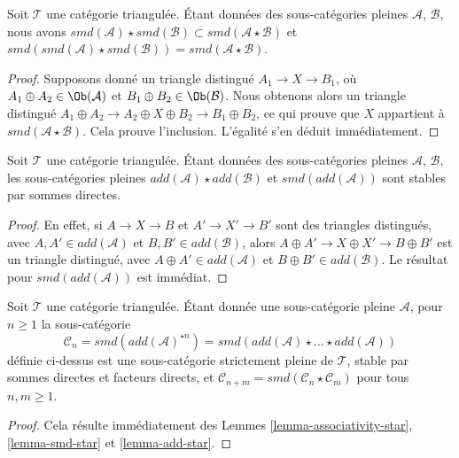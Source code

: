 \begin{lemma}
\label{lemma-smd-star}
Soit $\mathcal{T}$ une catégorie triangulée.
Étant données des sous-catégories pleines $\mathcal{A}$, $\mathcal{B}$, nous
avons
$smd(\mathcal{A}) \star smd(\mathcal{B}) \subset
smd(\mathcal{A} \star \mathcal{B})$ et
$smd(smd(\mathcal{A}) \star smd(\mathcal{B})) =
smd(\mathcal{A} \star \mathcal{B})$.
\end{lemma}

\begin{proof}
Supposons donné un triangle distingué $A_1 \to X \to B_1$, où
$A_1 \oplus A_2 \in \Ob(\mathcal{A})$ et
$B_1 \oplus B_2 \in \Ob(\mathcal{B})$.
Nous obtenons alors un triangle distingué
$A_1 \oplus A_2 \to A_2 \oplus X \oplus B_2 \to B_1 \oplus B_2$, ce qui
prouve que $X$ appartient à $smd(\mathcal{A} \star \mathcal{B})$.
Cela prouve l'inclusion. L'égalité s'en déduit immédiatement.
\end{proof}

\begin{lemma}
\label{lemma-add-star}
Soit $\mathcal{T}$ une catégorie triangulée. Étant données des sous-catégories
pleines $\mathcal{A}$, $\mathcal{B}$, les sous-catégories pleines
$add(\mathcal{A}) \star add(\mathcal{B})$ et $smd(add(\mathcal{A}))$ sont
stables par sommes directes.
\end{lemma}

\begin{proof}
En effet, si $A \to X \to B$ et $A' \to X' \to B'$ sont des triangles
distingués, avec $A, A' \in add(\mathcal{A})$ et
$B, B' \in add(\mathcal{B})$, alors
$A \oplus A' \to X \oplus X' \to B \oplus B'$ est un triangle distingué,
avec $A \oplus A' \in add(\mathcal{A})$ et
$B \oplus B' \in add(\mathcal{B})$.
Le résultat pour $smd(add(\mathcal{A}))$ est immédiat.
\end{proof}

\begin{lemma}
\label{lemma-cone-n}
Soit $\mathcal{T}$ une catégorie triangulée. Étant donnée une sous-catégorie
pleine $\mathcal{A}$, pour $n \geq 1$ la sous-catégorie
$$
\mathcal{C}_n = smd(add(\mathcal{A})^{\star n}) =
smd(add(\mathcal{A}) \star \ldots \star add(\mathcal{A}))
$$
définie ci-dessus est une sous-catégorie strictement pleine de $\mathcal{T}$,
stable par sommes directes et facteurs directs, et
$\mathcal{C}_{n + m} = smd(\mathcal{C}_n \star \mathcal{C}_m)$ pour tous
$n, m \geq 1$.
\end{lemma}

\begin{proof}
Cela résulte immédiatement des Lemmes \ref{lemma-associativity-star},
\ref{lemma-smd-star} et \ref{lemma-add-star}.
\end{proof}

